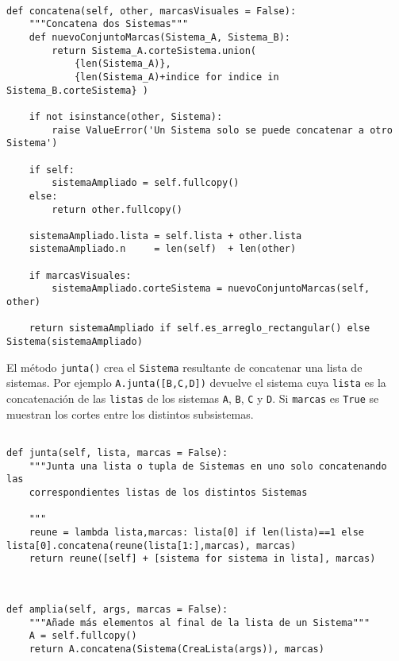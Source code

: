 \documentclass[11pt]{report}
\begin{document}
\begin{verbatim}

def concatena(self, other, marcasVisuales = False):
    """Concatena dos Sistemas"""    
    def nuevoConjuntoMarcas(Sistema_A, Sistema_B):
        return Sistema_A.corteSistema.union(
            {len(Sistema_A)},
            {len(Sistema_A)+indice for indice in Sistema_B.corteSistema} )
    
    if not isinstance(other, Sistema):
        raise ValueError('Un Sistema solo se puede concatenar a otro Sistema')

    if self:
        sistemaAmpliado = self.fullcopy()
    else:
        return other.fullcopy()
        
    sistemaAmpliado.lista = self.lista + other.lista
    sistemaAmpliado.n     = len(self)  + len(other)
        
    if marcasVisuales: 
        sistemaAmpliado.corteSistema = nuevoConjuntoMarcas(self, other)

    return sistemaAmpliado if self.es_arreglo_rectangular() else Sistema(sistemaAmpliado)

\end{verbatim}

El método \texttt{junta()} crea el \texttt{Sistema} resultante de concatenar una
lista de sistemas. Por ejemplo \texttt{A.junta([B,C,D])} devuelve el sistema
cuya \texttt{lista} es la concatenación de las \texttt{listas} de los sistemas \texttt{A},
\texttt{B}, \texttt{C} y \texttt{D}. Si \texttt{marcas} es \texttt{True} se muestran los cortes entre los
distintos subsistemas.
\begin{verbatim}

def junta(self, lista, marcas = False):
    """Junta una lista o tupla de Sistemas en uno solo concatenando las
    correspondientes listas de los distintos Sistemas

    """
    reune = lambda lista,marcas: lista[0] if len(lista)==1 else lista[0].concatena(reune(lista[1:],marcas), marcas)    
    return reune([self] + [sistema for sistema in lista], marcas)
    
\end{verbatim}

\begin{verbatim}

def amplia(self, args, marcas = False):
    """Añade más elementos al final de la lista de un Sistema"""
    A = self.fullcopy()
    return A.concatena(Sistema(CreaLista(args)), marcas)

\end{verbatim}
\end{document}
